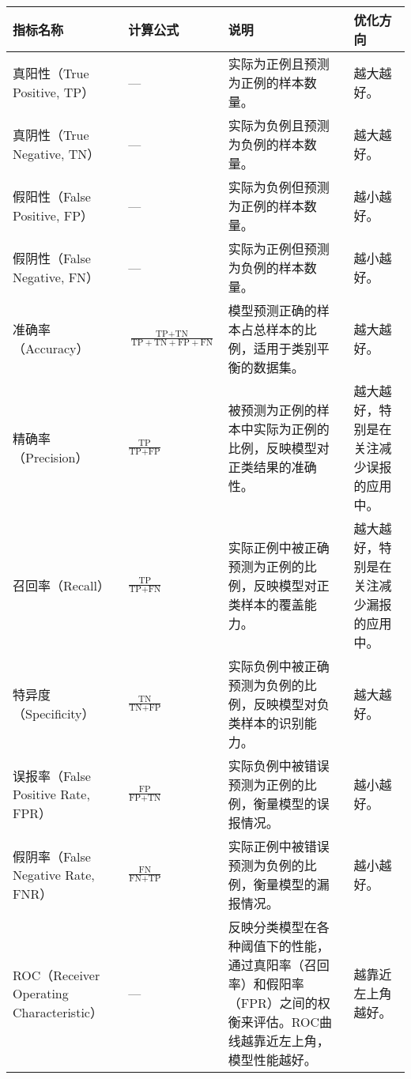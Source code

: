 \documentclass[lettersize,journal]{IEEEtran}
\begin{document}
\begin{table*}[h!]
\small
\centering
\begin{tabularx}{\textwidth}{|l|X|X|X|}
\hline
\textbf{指标名称} & \textbf{计算公式} & \textbf{说明} & \textbf{优化方向} \\ \hline

真阳性（True Positive, TP） & 
--- & 
实际为正例且预测为正例的样本数量。 & 越大越好。 \\ \hline

真阴性（True Negative, TN） & 
--- & 
实际为负例且预测为负例的样本数量。 & 越大越好。 \\ \hline

假阳性（False Positive, FP） & 
--- & 
实际为负例但预测为正例的样本数量。 & 越小越好。 \\ \hline

假阴性（False Negative, FN） & 
--- & 
实际为正例但预测为负例的样本数量。 & 越小越好。 \\ \hline

准确率（Accuracy） & 
$\frac{\text{TP} + \text{TN}}{\text{TP} + \text{TN} + \text{FP} + \text{FN}}$ & 
模型预测正确的样本占总样本的比例，适用于类别平衡的数据集。 & 越大越好。 \\ \hline

精确率（Precision） & 
$\frac{\text{TP}}{\text{TP} + \text{FP}}$ & 
被预测为正例的样本中实际为正例的比例，反映模型对正类结果的准确性。 & 越大越好，特别是在关注减少误报的应用中。 \\ \hline

召回率（Recall） & 
$\frac{\text{TP}}{\text{TP} + \text{FN}}$ & 
实际正例中被正确预测为正例的比例，反映模型对正类样本的覆盖能力。 & 越大越好，特别是在关注减少漏报的应用中。 \\ \hline

特异度（Specificity） & 
$\frac{\text{TN}}{\text{TN} + \text{FP}}$ & 
实际负例中被正确预测为负例的比例，反映模型对负类样本的识别能力。 & 越大越好。 \\ \hline

误报率（False Positive Rate, FPR） & 
$\frac{\text{FP}}{\text{FP} + \text{TN}}$ & 
实际负例中被错误预测为正例的比例，衡量模型的误报情况。 & 越小越好。 \\ \hline

假阴率（False Negative Rate, FNR） & 
$\frac{\text{FN}}{\text{FN} + \text{TP}}$ & 
实际正例中被错误预测为负例的比例，衡量模型的漏报情况。 & 越小越好。 \\ \hline

ROC（Receiver Operating Characteristic） & 
--- & 
反映分类模型在各种阈值下的性能，通过真阳率（召回率）和假阳率（FPR）之间的权衡来评估。ROC曲线越靠近左上角，模型性能越好。 & 越靠近左上角越好。 \\ \hline


\end{tabularx}
\end{table*}
\end{document}

